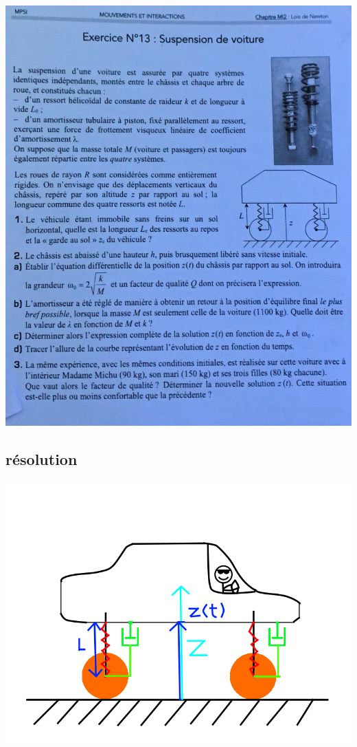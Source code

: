 \documentclass{article}
\begin{document}
\includegraphics[scale=0.4]{assets/physique/kholle8-1.png} \\

\subsection{résolution}

\includegraphics[scale=0.4]{assets/physique/kholle8-2.png}
\end{document}

